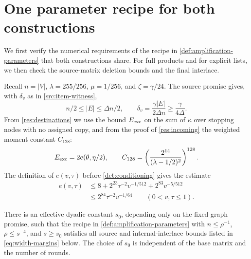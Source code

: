 \documentclass[11pt,letterpaper]{article} \usepackage[utf8]{inputenc}
\theoremstyle{plain} \newtheorem{theorem}{Theorem}[section]
\theoremstyle{definition} \newaliascnt{definition}{theorem}
\begin{document}
\section{One parameter recipe for both constructions}
\label{sec:parameters}

We first verify the numerical requirements of the recipe in
\cref{def:amplification-parameters} that both constructions share. For full
products and for explicit lists, we then check the source-matrix
deletion bounds and the final interlace.

Recall $n=|V|$, $\lambda=255/256$, $\mu=1/256$, and $\zeta=\gamma/24$.
The source promise gives, with $\delta_v$ as in \cref{src:item-witness},
\[
 n/2\le |E|\le\Delta n/2,\qquad
 \delta_v=\frac{\gamma|E|}{2\Delta n}\ge\frac{\gamma}{4\Delta}.
\]
From \cref{res:destinations} we use the bound $E_{\rm exc}$ on the sum of
$\kappa$ over stopping nodes with no assigned copy, and from the proof of
\cref{res:incoming} the weighted moment constant $C_{128}$:
\begin{equation}\label{eq:common-budgets}
E_{\rm exc}=2e(\theta,\eta/2),\qquad
C_{128}=\left(\frac{2^{14}}{(\lambda-1/2)^2}\right)^{128}.
\end{equation}
The definition
of $e(v,\tau)$ before \cref{det:conditioning} gives the estimate
\begin{equation}\label{eq:conditioning-size-bound}
\begin{aligned}
e(v,\tau)
&\le8+2^{23}\tau^{-2}v^{-1/512}+2^{83}v^{-5/512}\\
&\le2^{84}\tau^{-2}v^{-1/64}
\qquad(0<v,\tau\le1).
\end{aligned}
\end{equation}

\begin{lemma}\label{lem:common-schedule}
There is an effective dyadic constant $s_0$, depending only on the fixed
graph promise, such that the recipe in \cref{def:amplification-parameters}
with $n\le\rho^{-1}$, $\rho\le s^{-4}$, and $s\ge s_0$ satisfies all source
and internal-interlace bounds listed in \eqref{eq:width-margins} below. The choice of
$s_0$ is independent of the base matrix and the number of rounds.
\end{lemma}
\end{document}
